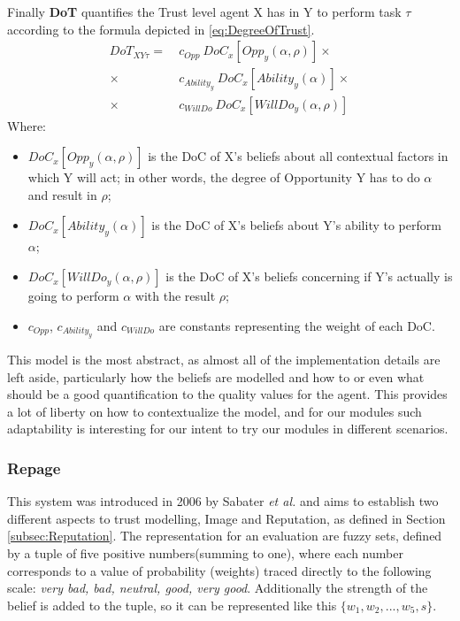 Finally \textbf{\ac{DoT}} quantifies the Trust level agent X has in Y to perform task $\tau$ according to the formula depicted in \ref{eq:DegreeOfTrust}.
\begin{equation}
	\begin{aligned}
		DoT_{XY\tau} =\ &c_{Opp}\ DoC_x[Opp_y(\alpha, \rho)] \times\\
					    \times\ &c_{Ability_y}\ DoC_x[Ability_y(\alpha)]\times \\
					    \times\ &c_{WillDo}\ DoC_x[WillDo_y(\alpha, \rho)]
	\end{aligned}
	\label{eq:DegreeOfTrust}
\end{equation}
Where:
\begin{itemize}
	\item $DoC_x[Opp_y(\alpha, \rho)]$ is the \ac{DoC} of X's beliefs about all contextual factors in which Y will act; in other words, the degree of Opportunity Y has to do $\alpha$ and result in $\rho$;
	\item $DoC_x[Ability_y(\alpha)]$ is the \ac{DoC} of X's beliefs about Y's ability to perform $\alpha$;
	\item $DoC_x[WillDo_y(\alpha, \rho)]$ is the \ac{DoC} of X's beliefs concerning if Y's actually is going to perform $\alpha$ with the result $\rho$;
	\item $c_{Opp}$, $c_{Ability_y}$ and $c_{WillDo}$ are constants representing the weight of each \ac{DoC}.
\end{itemize}

This model is the most abstract, as almost all of the implementation details are left aside, particularly how the beliefs are modelled and how to or even what should be a good quantification to the quality values for the agent. This provides a lot of liberty on how to contextualize the model, and for our modules such adaptability is interesting for our intent to try our modules in different scenarios.

\subsubsection{Repage}
\label{subsubsec:Related work:Trust Models:Repage}
This system was introduced in 2006 by Sabater \textit{et al.}\cite{Sabater2006} and aims to establish two different aspects to trust modelling, Image and Reputation, as defined in Section \ref{subsec:Reputation}. The representation for an evaluation are fuzzy sets, defined by a tuple of five positive numbers(summing to one), where each number corresponds to a value of probability (weights) traced directly to the following scale: \textit{very bad, bad, neutral, good, very good}. Additionally the strength of the belief is added to the tuple, so it can be represented like this $\{w_1, w_2, ..., w_5, s\}$.

